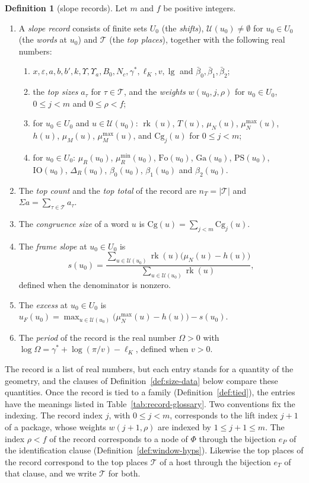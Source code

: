 \documentclass[11pt]{amsbook}
\theoremstyle{plain}
\theoremstyle{definition}
\newtheorem{definition}[theorem]{Definition}
\theoremstyle{remark}
\numberwithin{equation}{section}
\numberwithin{figure}{chapter}
\numberwithin{table}{chapter}
\newcommand{\eps}{\varepsilon}
\newcommand{\rk}{\operatorname{rk}}
\newcommand{\PS}{\mathrm{PS}}
\newcommand{\Top}{\mathcal{T}}
\newcommand{\Words}{\mathcal{U}}
\newcommand{\Cg}{\mathrm{Cg}}
\newcommand{\lgv}{\operatorname{lg}}
\newcommand{\Fo}{\mathrm{Fo}}
\newcommand{\Ga}{\mathrm{Ga}}
\newcommand{\IO}{\mathrm{IO}}
\begin{document}
\begin{definition}[slope records]\label{def:record}
Let $m$ and $f$ be positive integers.
\begin{enumerate}[label=(\arabic*)]
\item A \emph{slope record} consists of finite sets $U_0$ (the
\emph{shifts}), $\Words(u_0)\ne\emptyset$ for $u_0\in U_0$ (the
\emph{words} at $u_0$) and $\Top$ (the \emph{top places}),
together with the following real numbers:
\begin{enumerate}[label=(\alph*)]
\item $x,\eps,a,b,b',k,\Upsilon,\Upsilon_a,B_0,N_c,\gamma^*,\ell_K,v,
\lgv$ and $\bar\beta_0,\bar\beta_1,\bar\beta_2$;
\item the \emph{top sizes} $a_\tau$ for $\tau\in\Top$, and the
\emph{weights} $w(u_0,j,\rho)$ for $u_0\in U_0$, $0\le j<m$ and
$0\le\rho<f$;
\item for $u_0\in U_0$ and $u\in\Words(u_0)$: $\rk(u)$, $T(u)$,
$\mu_N(u)$, $\mu_N^{\max}(u)$, $h(u)$, $\mu_M(u)$, $\mu_M^{\max}(u)$,
and $\Cg_j(u)$ for $0\le j<m$;
\item for $u_0\in U_0$: $\mu_R(u_0)$, $\mu_R^{\min}(u_0)$, $\Fo(u_0)$,
$\Ga(u_0)$, $\PS(u_0)$, $\IO(u_0)$, $\Delta_R(u_0)$,
$\beta_0(u_0)$, $\beta_1(u_0)$ and $\beta_2(u_0)$.
\end{enumerate}
\item The \emph{top count} and the \emph{top total} of the record are
$n_T=|\Top|$ and $\Sigma a=\sum_{\tau\in\Top}a_\tau$.
\item The \emph{congruence size} of a word $u$ is
$\Cg(u)=\sum_{j<m}\Cg_j(u)$.
\item The \emph{frame slope} at $u_0\in U_0$ is
\[
s(u_0)=\frac{\sum_{u\in\Words(u_0)}\rk(u)\bigl(\mu_N(u)-h(u)\bigr)}
{\sum_{u\in\Words(u_0)}\rk(u)},
\]
defined when the denominator is nonzero.
\item The \emph{excess} at $u_0\in U_0$ is
$u_F(u_0)=\max_{u\in\Words(u_0)}\bigl(\mu_N^{\max}(u)-h(u)\bigr)
-s(u_0)$.
\item\label{item:rec-period}
The \emph{period} of the record is the real number $\Omega>0$
with $\log\Omega=\gamma^*+\log(\pi/v)-\ell_K$, defined when $v>0$.
\end{enumerate}
\end{definition}

\noindent The record is a list of real numbers, but each entry stands
for a quantity of the geometry, and the clauses of
Definition~\ref{def:size-data} below compare these quantities. Once
the record is tied to a family (Definition~\ref{def:tied}), the
entries have the meanings listed in Table~\ref{tab:record-glossary}.
Two conventions fix the indexing. The record index $j$, with
$0\le j<m$, corresponds to the lift index $j+1$ of a package, whose
weights $w(j+1,\rho)$ are indexed by $1\le j+1\le m$. The index
$\rho<f$ of the record corresponds to a node of $\Phi$ through the
bijection $e_P$ of the identification clause
(Definition~\ref{def:window-hyps}). Likewise the top places of the
record correspond to the top places $\Top$ of a host through the
bijection $e_T$ of that clause, and we write $\Top$ for both.
\end{document}
